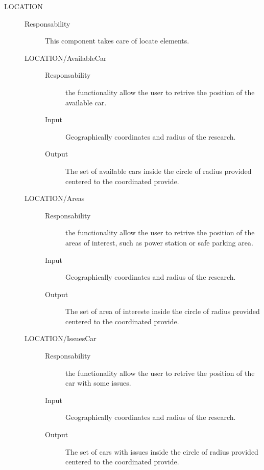 \documentclass[11pt]{article} %
\begin{document}
\begin{description}
	\item[LOCATION] \hfill
	\begin{description}
		\item[Responsability] This component takes care of locate elements.
	\item[LOCATION/AvailableCar] \hfill
		\begin{description}
			\item[Responsability] the functionality allow the user to retrive the position of the available car.
			\item[Input] Geographically coordinates and radius of the research.
			\item[Output] The set of available cars inside the circle of radius provided centered to the coordinated provide.
		\end{description}
	\item[LOCATION/Areas] \hfill
		\begin{description}
			\item[Responsability] the functionality allow the user to retrive the position of the areas of interest, such as power station or safe parking area.
			\item[Input] Geographically coordinates and radius of the research.
			\item[Output] The set of area of intereste inside the circle of radius provided centered to the coordinated provide.
		\end{description}
	\item[LOCATION/IssuesCar] \hfill
		\begin{description}
			\item[Responsability] the functionality allow the user to retrive the position of the car with some issues.
			\item[Input] Geographically coordinates and radius of the research.
			\item[Output] The set of cars with issues inside the circle of radius provided centered to the coordinated provide.
		\end{description}
	\end{description}
	

\end{description}
\end{document}
